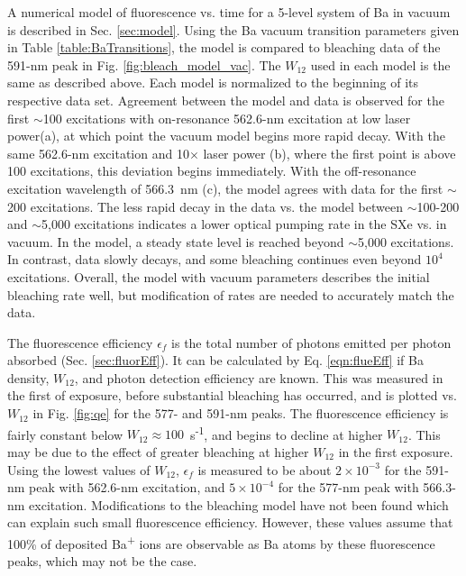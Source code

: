 A numerical model of fluorescence vs. time for a 5-level system of Ba in vacuum is described in Sec. \ref{sec:model}.  Using the Ba vacuum transition parameters given in Table \ref{table:BaTransitions}, the model is compared to bleaching data of the 591-nm peak in Fig. \ref{fig:bleach_model_vac}.  The $W_{12}$ used in each model is the same as described above.  Each model is normalized to the beginning of its respective data set.  Agreement between the model and data is observed for the first $\sim$100 excitations with on-resonance 562.6-nm excitation at low laser power(a), at which point the vacuum model begins more rapid decay.  With the same 562.6-nm excitation and 10$\times$ laser power (b), where the first point is above 100 excitations, this deviation begins immediately.  With the off-resonance excitation wavelength of 566.3~nm (c), the model agrees with data for the first $\sim$200 excitations.  The less rapid decay in the data vs. the model between $\sim$100-200 and $\sim$5,000 excitations indicates a lower optical pumping rate in the SXe vs. in vacuum.  In the model, a steady state level is reached beyond $\sim$5,000 excitations.  In contrast, data slowly decays, and some bleaching continues even beyond $10^{4}$ excitations.  Overall, the model with vacuum parameters describes the initial bleaching rate well, but modification of rates are needed to accurately match the data.

The fluorescence efficiency $\epsilon_{f}$ is the total number of photons emitted per photon absorbed (Sec. \ref{sec:fluorEff}).  It can be calculated by Eq. \ref{eqn:flueEff} if Ba density, $W_{12}$, and photon detection efficiency are known.  This was measured in the first of exposure, before substantial bleaching has occurred, and is plotted vs. $W_{12}$ in Fig. \ref{fig:qe} for the 577- and 591-nm peaks.  The fluorescence efficiency is fairly constant below $W_{12} \approx 100$~s\textsuperscript{-1}, and begins to decline at higher $W_{12}$.  This may be due to the effect of greater bleaching at higher $W_{12}$ in the first exposure.  Using the lowest values of $W_{12}$, $\epsilon_{f}$ is measured to be about $2 \times 10^{-3}$ for the 591-nm peak with 562.6-nm excitation, and $5 \times 10^{-4}$ for the 577-nm peak with 566.3-nm excitation.  Modifications to the bleaching model have not been found which can explain such small fluorescence efficiency.  However, these values assume that 100\% of deposited Ba\textsuperscript{+} ions are observable as Ba atoms by these fluorescence peaks, which may not be the case.

